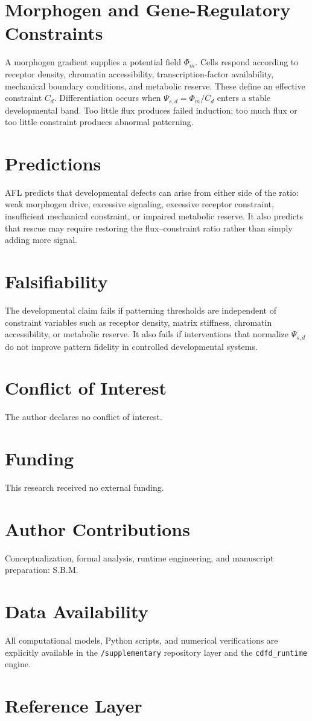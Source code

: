 \documentclass[11pt]{article}
\begin{document}
\section{Morphogen and Gene-Regulatory Constraints}
A morphogen gradient supplies a potential field $\Phi_m$. Cells respond according to receptor density, chromatin accessibility, transcription-factor availability, mechanical boundary conditions, and metabolic reserve. These define an effective constraint $C_d$. Differentiation occurs when $\Psi_{s,d}=\Phi_m/C_d$ enters a stable developmental band. Too little flux produces failed induction; too much flux or too little constraint produces abnormal patterning.

\section{Predictions}
AFL predicts that developmental defects can arise from either side of the ratio: weak morphogen drive, excessive signaling, excessive receptor constraint, insufficient mechanical constraint, or impaired metabolic reserve. It also predicts that rescue may require restoring the flux--constraint ratio rather than simply adding more signal.

\section{Falsifiability}
The developmental claim fails if patterning thresholds are independent of constraint variables such as receptor density, matrix stiffness, chromatin accessibility, or metabolic reserve. It also fails if interventions that normalize $\Psi_{s,d}$ do not improve pattern fidelity in controlled developmental systems.



\section*{Conflict of Interest} The author declares no conflict of interest.
\section*{Funding} This research received no external funding.
\section*{Author Contributions} Conceptualization, formal analysis, runtime engineering, and manuscript preparation: S.B.M.
\section*{Data Availability} All computational models, Python scripts, and numerical verifications are explicitly available in the \texttt{/supplementary} repository layer and the \texttt{cdfd\_runtime} engine.

\section{Reference Layer}


\end{document}
